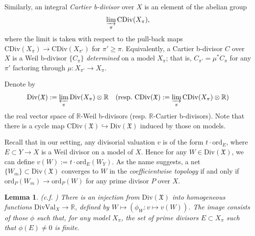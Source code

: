 \documentclass[11pt, leqno]{amsart}%
\theoremstyle{plain}
\newtheorem{lemma}[theorem]{Lemma}
\theoremstyle{definition}
\theoremstyle{remark}
\newcommand{\bR}{\mathbb{R}}
\newcommand{\fX}{\mathfrak{X}}
\newcommand{\ord}{\mathrm{ord}}
\newcommand{\DivVal}{\mathrm{DivVal}}
\newcommand{\Div}{\mathrm{Div}}
\newcommand{\CDiv}{\mathrm{CDiv}}
\begin{document}
Similarly, an integral \emph{Cartier b-divisor} over $X$ is an element of the abelian group
$$\varinjlim_\pi \CDiv(X_\pi),$$
where the limit is taken with respect to the pull-back maps $\CDiv(X_{\pi})\to\CDiv(X_{\pi'})$ for $\pi'\ge \pi$. 
Equivalently, a Cartier b-divisor $C$ over $X$ is a Weil b-divisor $\{C_\pi\}$ \emph{determined} on a model $X_\pi$; that is, $C_{\pi'}=\mu^*C_\pi$ for any $\pi'$ factoring through $\mu:X_{\pi'}\to X_\pi$. 
	
Denote by 
\[
\Div(\fX):= \varprojlim_\pi\Div(X_\pi)\otimes\bR\quad (\text{resp.}~ \CDiv(\fX):=\varinjlim_\pi\CDiv(X_\pi)\otimes\bR)
\]
the real vector space of $\bR$-Weil b-divisors (resp. $\bR$-Cartier b-divisors). 
Note that there is a cycle map $\CDiv(\fX)\hookrightarrow\Div(\fX)$ induced by those on models.

	
Recall that in our setting, any divisorial valuation $v$ is of the form $t\cdot \ord_E$, where $E\subset Y\to X$ is a Weil divisor on a model of $X$. Hence for any $W\in\Div(\fX)$, we can define $v(W):=t\cdot\ord_E(W_Y)$. 
As the name suggests, a net $\{W_m\}\subset \Div(\fX)$ converges to $W$ in the \emph{coefficientwise topology} if and only if $\ord_P(W_m)\to \ord_P(W)$ for any prime divisor $P$ over $X$. 
	
\begin{lemma}(c.f. \cite[Lemma 1.1]{BdFF-vol-iso}\label{lem:b-divisors as functions})
	There is an injection from $\Div(\fX)$ into homogeneous functions $\DivVal_X\to \bR$, defined by $W\mapsto (\phi_W:v\mapsto v(W))$. The image consists of those $\phi$ such that, for any model $X_\pi$, the set of prime divisors $E\subset X_\pi$ such that $\phi(E)\ne 0$ is finite. 
\end{lemma}
	
\end{document}
